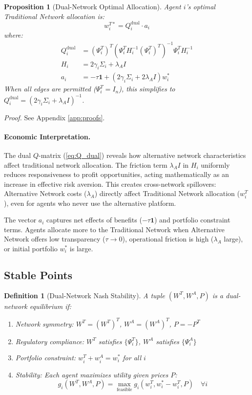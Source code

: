 \documentclass[12pt]{article}
\newtheorem{proposition}[theorem]{Proposition}
\newtheorem{definition}[theorem]{Definition}
\begin{document}
\begin{proposition}[Dual-Network Optimal Allocation]
\label{prop:dual_optimal}
Agent $i$'s optimal Traditional Network allocation is:
\begin{equation}
w_i^{T*} = Q_i^{\text{dual}} \cdot a_i
\label{eq:optimal_allocation}
\end{equation}
where:
\begin{align}
Q_i^{\text{dual}} &= (\Psi_i^T)^T(\Psi_i^T H_i^{-1} (\Psi_i^T)^T)^{-1}\Psi_i^T H_i^{-1} \label{eq:Q_dual} \\
H_i &= 2\gamma_i\Sigma_i + \lambda_A I \label{eq:H_matrix} \\
a_i &= -\tau \mathbf{1} + (2\gamma_i\Sigma_i + 2\lambda_A I) w_i^* \label{eq:offset_vector}
\end{align}
When all edges are permitted ($\Psi_i^T = I_n$), this simplifies to $Q_i^{\text{dual}} = (2\gamma_i\Sigma_i + \lambda_A I)^{-1}$.
\end{proposition}

\textit{Proof.} See Appendix \ref{app:proofs}.

\paragraph{Economic Interpretation.} The dual $Q$-matrix (\ref{eq:Q_dual}) reveals how alternative network characteristics affect traditional network allocation. The friction term $\lambda_A I$ in $H_i$ uniformly reduces responsiveness to profit opportunities, acting mathematically as an increase in effective risk aversion. This creates cross-network spillovers: Alternative Network costs ($\lambda_A$) directly affect Traditional Network allocation ($w_i^T$), even for agents who never use the alternative platform.

The vector $a_i$ captures net effects of benefits ($-\tau \mathbf{1}$) and portfolio constraint terms. Agents allocate more to the Traditional Network when Alternative Network offers low transparency ($\tau \to 0$), operational friction is high ($\lambda_A$ large), or initial portfolio $w_i^*$ is large.

\subsection{Stable Points}

\begin{definition}[Dual-Network Nash Stability]
\label{def:equilibrium}
A tuple $(W^T, W^A, P)$ is a dual-network equilibrium if:
\begin{enumerate}[noitemsep]
    \item Network symmetry: $W^T = (W^T)^T$, $W^A = (W^A)^T$, $P = -P^T$
    \item Regulatory compliance: $W^T$ satisfies $\{\Psi_i^T\}$, $W^A$ satisfies $\{\Psi_i^A\}$
    \item Portfolio constraint: $w_i^T + w_i^A = w_i^*$ for all $i$
    \item Stability: Each agent maximizes utility given prices $P$:
    \[
    g_i(W^T, W^A, P) = \max_{\text{feasible}} g_i(w_i^T, w_i^* - w_i^T, P) \quad \forall i
    \]
\end{enumerate}
\end{definition}
\end{document}
